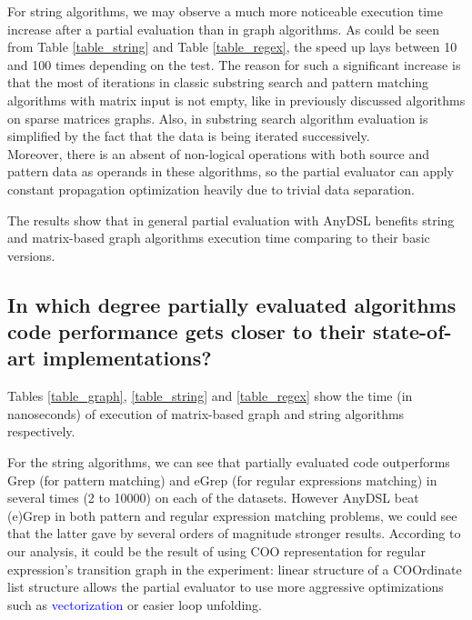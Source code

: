 \documentclass[conference]{IEEEtran}
\begin{document}
For string algorithms, we may observe a much more noticeable execution time increase after a partial evaluation than in graph algorithms. As could be seen from Table \ref{table_string} and Table \ref{table_regex}, the speed up lays between 10 and 100 times depending on the test. The reason for such a significant increase is that the most of iterations in classic substring search and pattern matching algorithms \cite{cormen2009introduction} with matrix input is not empty, like in previously discussed algorithms on sparse matrices graphs. Also, in substring search algorithm evaluation is simplified by the fact that the data is being iterated successively.\\
Moreover, there is an absent of non-logical operations with both source and pattern data as operands in these algorithms, so the partial evaluator can apply constant propagation optimization heavily due to trivial data separation.

The results show that in general partial evaluation with AnyDSL benefits string and matrix-based graph algorithms execution time comparing to their basic versions.


\begin{figure}
	\centering
\end{figure}

\subsection{In which degree partially evaluated algorithms code performance gets closer to their state-of-art implementations?}

Tables \ref{table_graph}, \ref{table_string} and \ref{table_regex} show the time (in nanoseconds) of execution of matrix-based graph and string algorithms respectively. 

For the string algorithms, we can see that partially evaluated code outperforms Grep (for pattern matching) and eGrep (for regular expressions matching) in several times (2 to 10000) on each of the datasets. However AnyDSL beat (e)Grep in both pattern and regular expression matching problems, we could see that the latter gave by several orders of magnitude stronger results. According to our analysis, it could be the result of using COO representation for regular expression's transition graph in the experiment: linear structure of a COOrdinate list structure allows the partial evaluator to use more aggressive optimizations such as \textcolor{blue}{vectorization} or easier loop unfolding.
\end{document}
